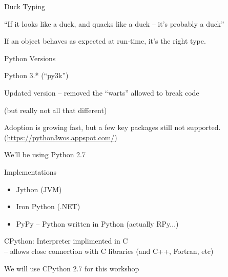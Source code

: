 \documentclass{beamer}
\begin{document}
\begin{frame}{Duck Typing}

\vspace{0.25in}
{\center \Large ``If it looks like a duck, and quacks like a duck -- it's probably a duck''}

\pause
\vspace{0.5in}
{\center \Large If an object behaves as expected at run-time, it's the right type.}

\end{frame}


\begin{frame}{Python Versions}

{\Large Python 3.* (``py3k'')}

\vfill
Updated version -- removed the ``warts'' allowed to break code

\vfill
(but really not all that different)

\vfill
Adoption is growing fast, but a few key packages still not supported.
(\url{https://python3wos.appspot.com/})

\vfill
{\Large We'll be using Python 2.7}

\end{frame}


\begin{frame}{Implementations}

\begin{itemize}
    \item Jython (JVM)
    \item Iron Python (.NET)
    \item PyPy -- Python written in Python (actually RPy...)
\end{itemize}

\vfill
{\Large CPython:} Interpreter implimented in C\\
-- allows close connection with C libraries (and C++, Fortran, etc)

\vfill
We will use CPython 2.7 for this workshop
\end{frame}
\end{document}

